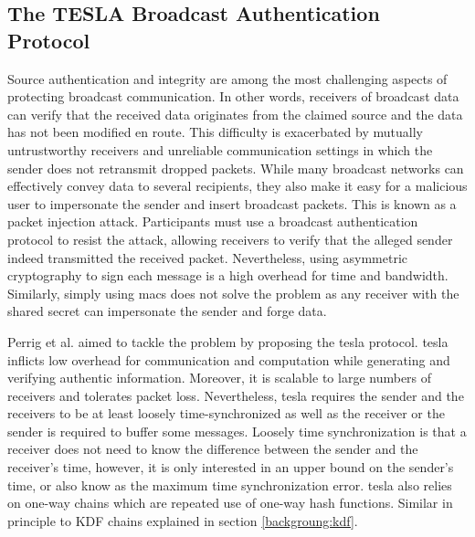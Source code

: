 \subsection{The TESLA Broadcast Authentication Protocol}
Source authentication and integrity are among the most challenging aspects of protecting broadcast communication. In other words, receivers of broadcast data can verify that the received data originates from the claimed source and the data has not been modified en route. This difficulty is exacerbated by mutually untrustworthy receivers and unreliable communication settings in which the sender does not retransmit dropped packets. While many broadcast networks can effectively convey data to several recipients, they also make it easy for a malicious user to impersonate the sender and insert broadcast packets. This is known as a packet injection attack. Participants must use a broadcast authentication protocol to resist the attack, allowing receivers to verify that the alleged sender indeed transmitted the received packet. Nevertheless, using asymmetric cryptography to sign each message is a high overhead for time and bandwidth. Similarly, simply using \glspl{mac} does not solve the problem as any receiver with the shared secret can impersonate the sender and forge data.
\par
Perrig et al. \cite{perrig2003tesla} aimed to tackle the problem by proposing the \gls{tesla} protocol. \gls{tesla} inflicts low overhead for communication and computation while generating and verifying authentic information. Moreover, it is scalable to large numbers of receivers and tolerates packet loss. Nevertheless, \gls{tesla} requires the sender and the receivers to be at least loosely time-synchronized as well as the receiver or the sender is required to buffer some messages. Loosely time synchronization is that a receiver does not need to know the difference between the sender and the receiver’s time, however, it is only interested in an upper bound on the sender's time, or also know as the maximum time synchronization error. \gls{tesla} also relies on one-way chains which are repeated use of one-way hash functions. Similar in principle to KDF chains explained in section \ref{backgroung:kdf}. 
\par
